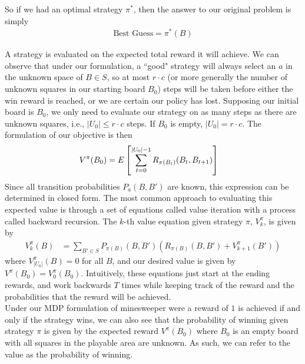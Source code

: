 
So if we had an optimal strategy $\pi^*$, then the answer to our original problem is simply
\begin{align*}
    \text{Best Guess}=\pi^*(B)
\end{align*}

A strategy is evaluated on the expected total reward it will achieve. We can observe that under our formulation, a ``good" strategy will always select an $a$ in the unknown space of $B\in S$, so at most $r\cdot c$ (or more generally the number of unknown squares in our starting board $B_0$) steps will be taken before either the win reward is reached, or we are certain our policy has lost. Supposing our initial board is $B_0$, we only need to evaluate our strategy on as many steps as there are unknown squares, i.e., $|U_0|\leq r\cdot c$ steps. If $B_0$ is empty, $|U_0|=r\cdot c$. The formulation of our objective is then
\begin{align*}
    V^{\pi}(B_0)&=E\left[\sum_{t=0}^{|U_0|-1}R_{\pi(B_t)}(B_t,B_{t+1})\right]
\end{align*}
Since all transition probabilities $P_a(B,B')$ are known, this expression can be determined in closed form. The most common approach to evaluating this expected value is through a set of equations called value iteration with a process called backward recursion. The $k$-th value equation given strategy $\pi$, $V_k^\pi$, is given by
\begin{align*}
    V_k^{\pi}(B)&=\sum_{B'\in S}P_{\pi(B)}(B,B')(R_{\pi(B)}(B,B')+V_{k+1}^{\pi}(B'))
\end{align*}
where $V_{|U_0|}^\pi(B)=0$ for all $B$, and our desired value is given by $V^\pi(B_0)=V_0^\pi(B_0)$. Intuitively, these equations just start at the ending rewards, and work backwards $T$ times while keeping track of the reward and the probabilities that the reward will be achieved.\\

Under our MDP formulation of minesweeper were a reward of $1$ is achieved if and only if the strategy wins, we can also see that the probability of winning given strategy $\pi$ is given by the expected reward $V^{\pi}(B_0)$ where $B_0$ is an empty board with all squares in the playable area are unknown. As such, we can refer to the value as the probability of winning.\\

